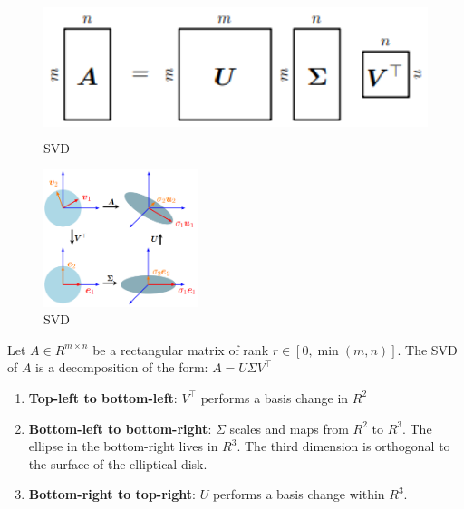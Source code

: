 \begin{table}[h]
    \begin{minipage}[b]{0.49\linewidth}
        \begin{figure}[H]
            \centering
            \includegraphics[width=\linewidth, height=4cm, keepaspectratio]{Pictures/maths/svd-1.png}
            \caption{SVD}
        \end{figure}
    \end{minipage}
    \hfill
    \begin{minipage}[b]{0.49\linewidth}
        \begin{figure}[H]
            \centering
            \includegraphics[width=\linewidth, height=4cm, keepaspectratio]{Pictures/maths/svd-2.png}
            \caption{SVD}
        \end{figure}
    \end{minipage}
\end{table}

\begin{theorem}
    Let $A \in R^{m\times n}$ be a rectangular matrix of rank $r \in [0, \min(m, n)]$. The SVD of $A$ is a decomposition of the form: $A = U\Sigma V^\top$
\end{theorem}

\begin{enumerate}
    \item \textbf{Top-left to bottom-left}: $V^\top$ performs a basis change in $R^2$ 

    \item \textbf{Bottom-left to bottom-right}: $\Sigma$ scales and maps from $R^2$ to $R^3$. The ellipse in the bottom-right lives in $R^3$. The third dimension is orthogonal to the surface of the elliptical disk.

    \item \textbf{Bottom-right to top-right}: $U$ performs a basis change within $R^3$.
\end{enumerate}

